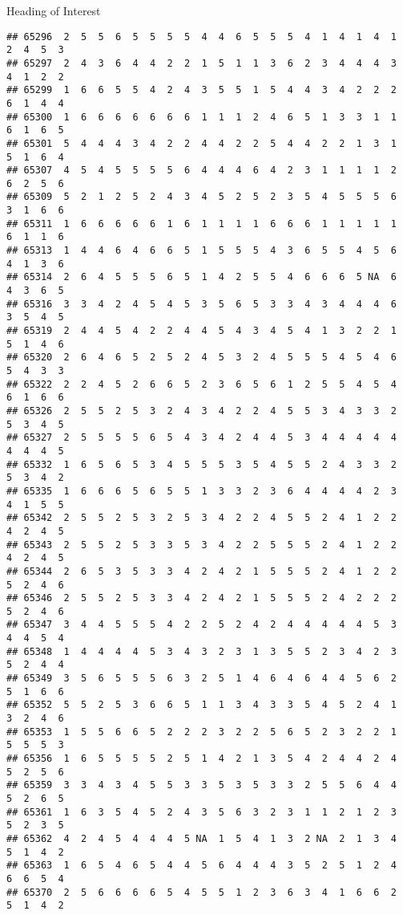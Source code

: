 \documentclass[
  ignorenonframetext,
]{beamer}
\begin{document}
\begin{frame}[fragile]{Heading of Interest}
\begin{verbatim}
## 65296  2  5  5  6  5  5  5  5  4  4  6  5  5  5  4  1  4  1  4  1  2  4  5  3
## 65297  2  4  3  6  4  4  2  2  1  5  1  1  3  6  2  3  4  4  4  3  4  1  2  2
## 65299  1  6  6  5  5  4  2  4  3  5  5  1  5  4  4  3  4  2  2  2  6  1  4  4
## 65300  1  6  6  6  6  6  6  6  1  1  1  2  4  6  5  1  3  3  1  1  6  1  6  5
## 65301  5  4  4  4  3  4  2  2  4  4  2  2  5  4  4  2  2  1  3  1  5  1  6  4
## 65307  4  5  4  5  5  5  5  6  4  4  4  6  4  2  3  1  1  1  1  2  6  2  5  6
## 65309  5  2  1  2  5  2  4  3  4  5  2  5  2  3  5  4  5  5  5  6  3  1  6  6
## 65311  1  6  6  6  6  6  1  6  1  1  1  1  6  6  6  1  1  1  1  1  6  1  1  6
## 65313  1  4  4  6  4  6  6  5  1  5  5  5  4  3  6  5  5  4  5  6  4  1  3  6
## 65314  2  6  4  5  5  5  6  5  1  4  2  5  5  4  6  6  6  5 NA  6  4  3  6  5
## 65316  3  3  4  2  4  5  4  5  3  5  6  5  3  3  4  3  4  4  4  6  3  5  4  5
## 65319  2  4  4  5  4  2  2  4  4  5  4  3  4  5  4  1  3  2  2  1  5  1  4  6
## 65320  2  6  4  6  5  2  5  2  4  5  3  2  4  5  5  5  4  5  4  6  5  4  3  3
## 65322  2  2  4  5  2  6  6  5  2  3  6  5  6  1  2  5  5  4  5  4  6  1  6  6
## 65326  2  5  5  2  5  3  2  4  3  4  2  2  4  5  5  3  4  3  3  2  5  3  4  5
## 65327  2  5  5  5  5  6  5  4  3  4  2  4  4  5  3  4  4  4  4  4  4  4  4  5
## 65332  1  6  5  6  5  3  4  5  5  5  3  5  4  5  5  2  4  3  3  2  5  3  4  2
## 65335  1  6  6  6  5  6  5  5  1  3  3  2  3  6  4  4  4  4  2  3  4  1  5  5
## 65342  2  5  5  2  5  3  2  5  3  4  2  2  4  5  5  2  4  1  2  2  4  2  4  5
## 65343  2  5  5  2  5  3  3  5  3  4  2  2  5  5  5  2  4  1  2  2  4  2  4  5
## 65344  2  6  5  3  5  3  3  4  2  4  2  1  5  5  5  2  4  1  2  2  5  2  4  6
## 65346  2  5  5  2  5  3  3  4  2  4  2  1  5  5  5  2  4  2  2  2  5  2  4  6
## 65347  3  4  4  5  5  5  4  2  2  5  2  4  2  4  4  4  4  4  5  3  4  4  5  4
## 65348  1  4  4  4  4  5  3  4  3  2  3  1  3  5  5  2  3  4  2  3  5  2  4  4
## 65349  3  5  6  5  5  5  6  3  2  5  1  4  6  4  6  4  4  5  6  2  5  1  6  6
## 65352  5  5  2  5  3  6  6  5  1  1  3  4  3  3  5  4  5  2  4  1  3  2  4  6
## 65353  1  5  5  6  6  5  2  2  2  3  2  2  5  6  5  2  3  2  2  1  5  5  5  3
## 65356  1  6  5  5  5  5  2  5  1  4  2  1  3  5  4  2  4  4  2  4  5  2  5  6
## 65359  3  3  4  3  4  5  5  3  3  5  3  5  3  3  2  5  5  6  4  4  5  2  6  5
## 65361  1  6  3  5  4  5  2  4  3  5  6  3  2  3  1  1  2  1  2  3  5  2  3  5
## 65362  4  2  4  5  4  4  4  5 NA  1  5  4  1  3  2 NA  2  1  3  4  5  1  4  2
## 65363  1  6  5  4  6  5  4  4  5  6  4  4  4  3  5  2  5  1  2  4  6  6  5  4
## 65370  2  5  6  6  6  6  5  4  5  5  1  2  3  6  3  4  1  6  6  2  5  1  4  2

\end{verbatim}
\end{frame}
\end{document}
